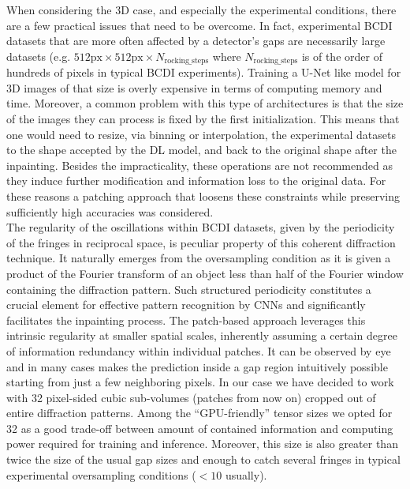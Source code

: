 When considering the 3D case, and especially the experimental conditions, there are a few practical issues that need
to be overcome. In fact, experimental BCDI datasets that are more often affected by a detector's gaps are necessarily large
datasets (e.g. $512\text{px} \times 512\text{px} \times N_{\text{rocking\_steps}}$ where $ N_{\text{rocking\_steps}}$ is of 
the order of hundreds of pixels in typical BCDI experiments). 
Training a U-Net like model for 3D images of that size is 
overly expensive in terms of computing memory and time. Moreover, a common problem with this type of architectures is that
the size of the images they can process is fixed by the first initialization. This means that one would need to resize, via 
binning or interpolation, the experimental datasets to the shape accepted by the DL model, and back to the original
shape after the inpainting. Besides the impracticality, these operations are not recommended as they induce further
modification and information loss to the original data. For these reasons a patching approach that 
loosens these constraints while preserving sufficiently high accuracies was considered. \\

The regularity of the oscillations within BCDI datasets, given by the periodicity of the fringes in reciprocal space, 
is peculiar property of this coherent diffraction technique. It naturally emerges from the oversampling condition 
as it is given a product of the Fourier transform of an object less than half of the Fourier window containing the 
diffraction pattern. Such structured periodicity constitutes a crucial element for effective pattern recognition 
by CNNs and significantly facilitates the inpainting process. The patch-based approach leverages this intrinsic 
regularity at smaller spatial scales, inherently assuming a certain degree of information redundancy within individual 
patches.
It can be observed by eye and in many cases makes the prediction inside a gap region intuitively possible starting 
from just a few neighboring pixels. 
In our case we have decided to work with 32 pixel-sided cubic sub-volumes (patches from now on) cropped out of entire diffraction 
patterns. Among the ``GPU-friendly'' tensor sizes \cite{nvidia_tensor_cores_optimization} we opted for 32 as a good trade-off
between amount of contained information and computing power required for training and inference. Moreover, this size is 
also greater than twice the size of the usual gap sizes and enough to catch several fringes in typical experimental 
oversampling conditions ($< 10$ usually). 

